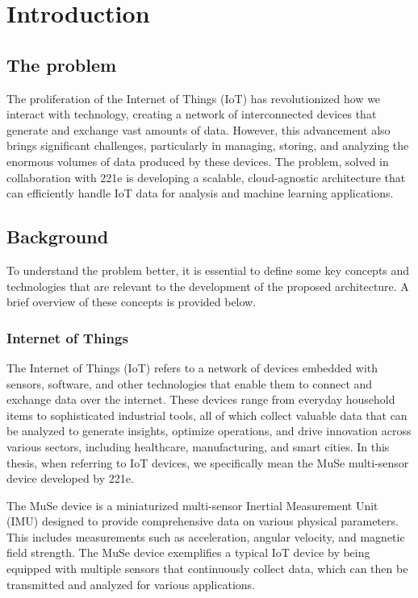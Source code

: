 \chapter{Introduction}
\label{cap:introduction}

\section{The problem}
\label{sec:the-problem}
The proliferation of the Internet of Things (IoT) has revolutionized how we interact with technology, creating a network of interconnected devices that generate and exchange vast amounts of data. However, this advancement also brings significant challenges, particularly in managing, storing, and analyzing the enormous volumes of data produced by these devices. The problem, solved in collaboration with 221e is developing a scalable, cloud-agnostic architecture that can efficiently handle IoT data for analysis and machine learning applications.

\section{Background}
\label{sec:background}
To understand the problem better, it is essential to define some key concepts and technologies that are relevant to the development of the proposed architecture. A brief overview of these concepts is provided below.

\subsection*{Internet of Things}
\label{sec:internet-of-things}
The Internet of Things (IoT) refers to a network of devices embedded with sensors, software, and other technologies that enable them to connect and exchange data over the internet. These devices range from everyday household items to sophisticated industrial tools, all of which collect valuable data that can be analyzed to generate insights, optimize operations, and drive innovation across various sectors, including healthcare, manufacturing, and smart cities.  In this thesis, when referring to IoT devices, we specifically mean the MuSe multi-sensor device developed by 221e\cite{site:221e}.

The MuSe device is a miniaturized multi-sensor Inertial Measurement Unit (IMU) designed to provide comprehensive data on various physical parameters. This includes measurements such as acceleration, angular velocity, and magnetic field strength. The MuSe device exemplifies a typical IoT device by being equipped with multiple sensors that continuously collect data, which can then be transmitted and analyzed for various applications.

